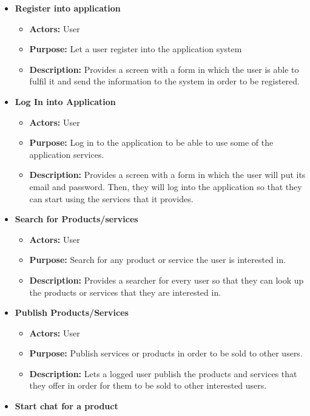 \documentclass[./main.tex]{subfiles}
\begin{document}
\begin{itemize}

\item
  \textbf{Register into application}

  \begin{itemize}
  
  \item
    \textbf{Actors:} User
  \item
    \textbf{Purpose:} Let a user register into the application system
  \item
    \textbf{Description:} Provides a screen with a form in which the
    user is able to fulfil it and send the information to the system in
    order to be registered.
  \end{itemize}
\item
  \textbf{Log In into Application}

  \begin{itemize}
  
  \item
    \textbf{Actors:} User
  \item
    \textbf{Purpose:} Log in to the application to be able to use some
    of the application services.
  \item
    \textbf{Description:} Provides a screen with a form in which the
    user will put its email and password. Then, they will log into the
    application so that they can start using the services that it provides.
  \end{itemize}
\item
  \textbf{Search for Products/services}

  \begin{itemize}
  
  \item
    \textbf{Actors:} User
  \item
    \textbf{Purpose:} Search for any product or service the user is
    interested in.
  \item
    \textbf{Description:} Provides a searcher for every user so that
    they can look up the products or services that they are interested
    in.
  \end{itemize}
\item
  \textbf{Publish Products/Services}

  \begin{itemize}
  
  \item
    \textbf{Actors:} User
  \item
    \textbf{Purpose:} Publish services or products in order to be sold
    to other users.
  \item
    \textbf{Description:} Lets a logged user publish the products and
    services that they offer in order for them to be sold to other
    interested users.
  \end{itemize}
\item
  \textbf{Start chat for a product}


\end{itemize}
\end{document}
